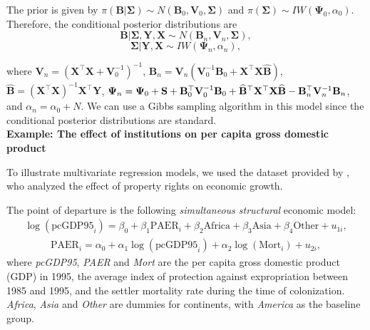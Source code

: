 The prior is given by   $\pi(\bm{B}|\bm{\Sigma})\sim{N}(\bm{B}_0,\bm{V}_0, \bm{\Sigma})$ and $\pi(\bm{\Sigma})\sim{I}{W}(\bm{\Psi}_0,\alpha_0)$. Therefore, the conditional posterior distributions are
\begin{equation*}
	\bm{B}|\bm{\Sigma}, \bm{Y}, \bm{X} \sim{N}(\bm{B}_n, \bm{V}_n, \bm{\Sigma}), 
\end{equation*}
\begin{equation*}
	\bm{\Sigma}| \bm{Y}, \bm{X} \sim {I}{W}(\bm{\Psi}_n, \alpha_n),
\end{equation*}

where $\bm{V}_n=(\bm{X}^{\top}\bm{X}+\bm{V}_0^{-1})^{-1}$, $\bm{B}_n=\bm{V}_n(\bm{V}_0^{-1}\bm{B}_0 + \bm{X}^{\top}\bm{X}\hat{\bm{B}})$, $\hat{\bm{B}}=(\bm{X}^{\top}\bm{X})^{-1}\bm{X}^{\top}\bm{Y}$, $\bm{\Psi}_n = {\bf{\Psi}}_{0}+{\bf{S}}+{\bf{B}}_{0}^{\top}{\bf{V}}_{0}^{-1}{\bf{B}}_{0}+\widehat{\bf{B}}^{\top}{\bf{X}}^{\top}{\bf{X}}\widehat{\bf{B}}-{\bf{B}}_n^{\top}{\bf{V}}_n^{-1}{\bf{B}}_n$, and $\alpha_n = \alpha_0 + N$. We can use a Gibbs sampling algorithm in this model since the conditional posterior distributions are standard.\\

\textbf{Example: The effect of institutions on per capita gross domestic product}

To illustrate multivariate regression models, we used the dataset provided by \cite{Acemoglu2001}, who analyzed the effect of property rights on economic growth.

The point of departure is the following \textit{simultaneous structural} economic model:
\begin{align}\label{eq:str1}
	\log(\text{pcGDP95}_i)=\beta_0+\beta_1\text{PAER}_i+\beta_2 \text{Africa}+\beta_3 \text{Asia}+\beta_4 \text{Other}+u_{1i},
\end{align}
\begin{align}\label{eq:str2}
	\text{PAER}_i=\alpha_0+\alpha_1\log(\text{pcGDP95}_i)+\alpha_2\log(\text{Mort}_i)+u_{2i},
\end{align}
where \textit{pcGDP95}, \textit{PAER} and \textit{Mort} are the per capita gross domestic product (GDP) in 1995, the average index of protection against expropriation between 1985 and 1995, and the settler mortality rate during the time of colonization. \textit{Africa}, \textit{Asia} and \textit{Other} are dummies for continents, with \textit{America} as the baseline group.

